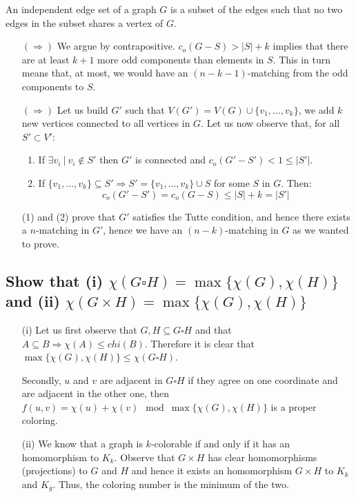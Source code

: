 \begin{remark}
    An independent edge set of a graph $G$ is a subset of the edges such that no two edges in the subset shares a vertex of $G$.
\end{remark}

\begin{itemize}
    \item[$(\Rightarrow)$] We argue by contrapositive.
        $c_o(G-S) > |S| + k$ implies that there are at least $k+1$ more odd components than elements in $S$.
        This in turn means that, at most, we would have an $(n - k -1)$-matching from the odd components to $S$.
    \item[$(\Rightarrow)$] Let us build $G'$ such that $V(G') = V(G) \cup \{v_1, \dots, v_k \}$, we add $k$ new vertices connected to all vertices in $G$.
        Let us now observe that, for all $S' \subset V'$:
        \begin{enumerate}
            \item If $\exists v_i \: | \: v_i \not\in S'$ then $G'$ is connected and $c_o(G' - S') < 1 \leq |S'|$.
            \item If $\{ v_1, \dots, v_k \} \subseteq S' \Rightarrow S' = \{v_1, \dots, v_k \} \cup S$ for some $S$ in $G$.
                Then:
                $$c_o(G' - S') = c_o(G - S) \leq |S| + k = |S'|$$
        \end{enumerate}
        (1) and (2) prove that $G'$ satisfies the Tutte condition, and hence there exists a $n$-matching in $G'$, hence we have an $(n-k)$-matching in $G$ as we wanted to prove.
\end{itemize}

\newpage

\subsection[Matchings 9]{Show that (i) $\chi(G\square H) = \max\{\chi(G),\chi(H)\}$ and (ii) $\chi(G\times H) = \max\{\chi(G),\chi(H)\}$}

\begin{itemize}
    \item[(i)] Let us first observe that $G, H \subseteq G \square H$ and that $A \subseteq B \Rightarrow \chi(A) \leq chi(B)$.
        Therefore it is clear that $\max\{\chi(G), \chi(H)\} \leq \chi(G \square H)$.

        Secondly, $u$ and $v$ are adjacent in $G \square H$ if they agree on one coordinate and are adjacent in the other one, then $f(u,v) = \chi(u) + \chi(v) \mod \max\{\chi(G), \chi(H)\}$ is a proper coloring.
    \item[(ii)] We know that a graph is $k$-colorable if and only if it has an homomorphism to $K_k$. 
        Observe that $G \times H$ has clear homomorphisms (projections) to $G$ and $H$ and hence it exists an homomorphism $G \times H$ to $K_k$ and $K_g$.
        Thus, the coloring number is the minimum of the two.
\end{itemize}
